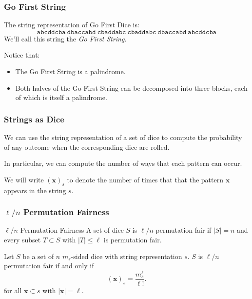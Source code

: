 \documentclass[aspectratio=169]{beamer}
\begin{document}
\begin{frame}[triangle=siiblue]
\frametitle{Go First String}
The string representation of Go First Dice is:
\begin{equation*}
	\texttt{abcddcba} \ \texttt{dbaccabd} \ \texttt{cbaddabc} \  \texttt{cbaddabc} \ \texttt{dbaccabd} \ \texttt{abcddcba}
\end{equation*}
We'll call this string the \emph{Go First String}.

\vfill

Notice that:
\begin{itemize}
	\item The Go First String is a palindrome.  
	\item Both halves of the Go First String can be decomposed into three blocks, each of which is itself a palindrome.
\end{itemize}
\end{frame}

\begin{frame}[triangle=siiblue]
\frametitle{Strings as Dice}
We can use the string representation of a set of dice to compute the probability of any outcome when the corresponding dice are rolled.

\vfill

In particular, we can compute the number of ways that each pattern can occur.

\vfill

We will write $(\mathbf{x})_s$ to denote the number of times that that the pattern $\mathbf{x}$ appears in the string $s$.

\end{frame}

\begin{frame}[triangle=siiblue]
\frametitle{$\ell/n$ Permutation Fairness}
\begin{siidefinition}{$\ell/n$ Permutation Fairness}{}
	A set of dice $S$ is $\ell/n$ permutation fair if $|S| = n$ and every subset $T \subset S$ with $|T| \leq \ell$ is permutation fair.
\end{siidefinition}

\vfill

\begin{siilemma}[label=perm_fair_counts]{}{}
Let $S$ be a set of $n$ $m_s$-sided dice with string representation $s$.  $S$ is $\ell/n$ permutation fair if and only if
\begin{equation*}
(\mathbf{x})_s = \frac{m_s^\ell}{\ell!}.
\end{equation*}
for all $\mathbf{x} \subset s$ with $|\mathbf{x}| = \ell$.
\end{siilemma}
\end{frame}
\end{document}
